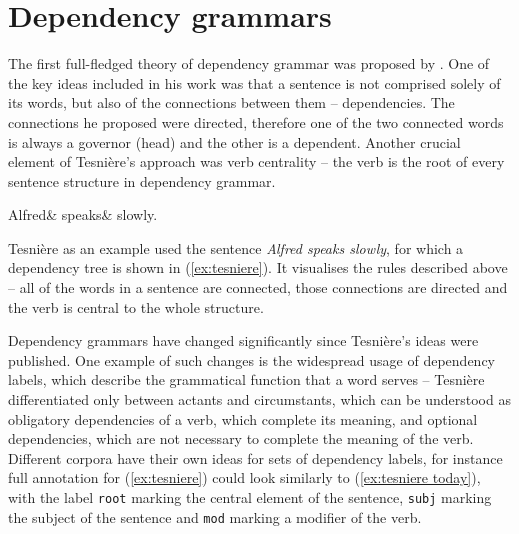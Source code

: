 \section{Dependency grammars}
The first full-fledged theory of dependency grammar was proposed by \cite{tesniere-orig, tesniere}. One of the key ideas included in his work was that a sentence is not comprised solely of its words, but also of the connections between them -- dependencies. The connections he proposed were directed, therefore one of the two connected words is always a governor (head) and the other is a dependent. Another crucial element of Tesnière's approach was verb centrality -- the verb is the root of every sentence structure in dependency grammar. 

\begin{center}
\begin{exe}
	\ex\label{ex:tesniere}
    \begin{dependency}[theme = simple, baseline=-\the\dimexpr\fontdimen22\textfont2\relax]
    \begin{deptext}
        Alfred\& speaks\& slowly.\\
    \end{deptext}
    \end{dependency}
\end{exe}
\end{center}

Tesnière as an example used the sentence \textsl{Alfred speaks slowly}, for which a dependency tree is shown in (\ref{ex:tesniere}). It visualises the rules described above -- all of the words in a sentence are connected, those connections are directed and the verb is central to the whole structure. 

Dependency grammars have changed significantly since Tesnière's ideas were published. One example of such changes is the widespread usage of dependency labels, which describe the grammatical function that a word serves -- Tesnière differentiated only between actants and circumstants, which can be understood as obligatory dependencies of a verb, which complete its meaning, and optional dependencies, which are not necessary to complete the meaning of the verb. Different corpora have their own ideas for sets of dependency labels, for instance full annotation for (\ref{ex:tesniere}) could look similarly to (\ref{ex:tesniere today}), with the label \texttt{root} marking the central element of the sentence, \texttt{subj} marking the subject of the sentence and \texttt{mod} marking a modifier of the verb.

